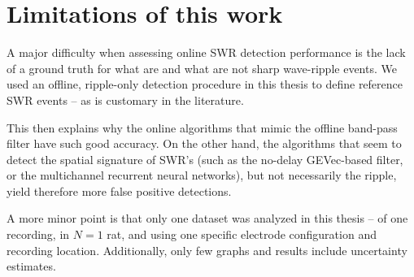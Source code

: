 \section{Limitations of this work}
\label{sec:limits}

A major difficulty when assessing online SWR detection performance is the lack of a ground truth for what are and what are not sharp wave-ripple events. We used an offline, ripple-only detection procedure in this thesis to define reference SWR events -- as is customary in the literature.

This then explains why the online algorithms that mimic the offline band-pass filter have such good accuracy. On the other hand, the algorithms that seem to detect the spatial signature of SWR's (such as the no-delay GEVec-based filter, or the multichannel recurrent neural networks), but not necessarily the ripple, yield therefore more false positive detections.

A more minor point is that only one dataset was analyzed in this thesis -- of one recording, in $N = 1$ rat, and using one specific electrode configuration and recording location. Additionally, only few graphs and results include uncertainty estimates.
